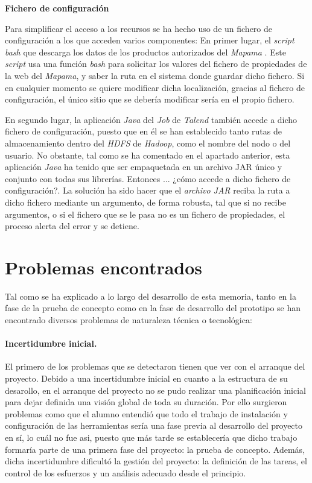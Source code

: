 \par 
\textbf{Fichero de configuración}
\bigskip
\par
Para simplificar el acceso a los recursos se ha hecho uso de un fichero de configuración a los que acceden varios componentes: En primer lugar, el \textit{script bash} que descarga los datos de los productos autorizados del \textit{Mapama} \cite{mapama}. Este \textit{script} usa una función \textit{bash} para solicitar los valores del fichero de propiedades de la web del \textit{Mapama}, y saber la ruta en el sistema donde guardar dicho fichero. Si en cualquier momento se quiere modificar dicha localización, gracias al fichero de configuración, el único sitio que se debería modificar sería en el propio fichero. 
\par En segundo lugar, la aplicación \textit{Java} del \textit{Job} de \textit{Talend} también accede a dicho fichero de configuración, puesto que en él se han establecido tanto rutas de almacenamiento dentro del \textit{HDFS} de \textit{Hadoop}, como el nombre del nodo o del usuario. No obstante, tal como se ha comentado en el apartado anterior, esta aplicación \textit{Java} ha tenido que ser empaquetada en un archivo JAR único y conjunto con todas sus librerías. Entonces ... ¿cómo accede a dicho fichero de configuración?. La solución ha sido hacer que el \textit{archivo JAR} reciba la ruta a dicho fichero mediante un argumento, de forma robusta, tal que si no recibe argumentos, o si el fichero que se le pasa no es un fichero de propiedades, el proceso alerta del error y se detiene. 
\bigskip


\section{Problemas encontrados} \label{implementacion.problemas}
\par
Tal como se ha explicado a lo largo del desarrollo de esta memoria, tanto en la fase de la prueba de concepto como en la fase de desarrollo del prototipo se han encontrado diversos problemas de naturaleza técnica o tecnológica:

\paragraph*{Incertidumbre inicial.} El primero de los problemas que se detectaron tienen que ver con el arranque del proyecto. Debido a una incertidumbre inicial en cuanto a la estructura de su desarollo, en el arranque del proyecto no se pudo realizar una planificación inicial para dejar definida una visión global de toda su duración. Por ello surgieron problemas como que el alumno entendió que todo el trabajo de instalación y configuración de las herramientas sería una fase previa al desarrollo del proyecto en sí, lo cuál no fue asi, puesto que más tarde se establecería que dicho trabajo formaría parte de una primera fase del proyecto: la prueba de concepto. Además, dicha incertidumbre dificultó la gestión del proyecto: la definición de las tareas, el control de los esfuerzos y un análisis adecuado desde el principio.

